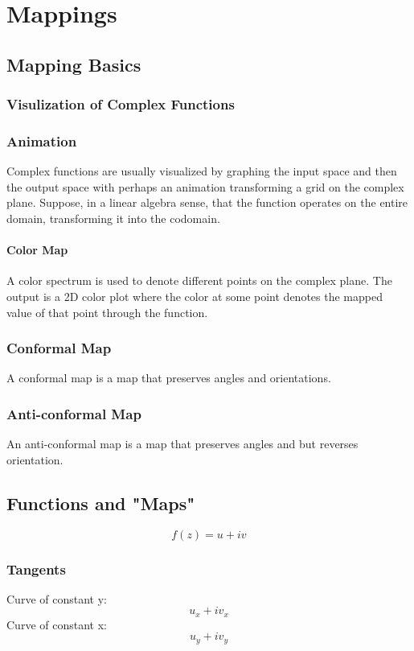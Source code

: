 \documentclass[../main.tex]{subfiles}
\begin{document}
\chapter{Mappings}
\section{Mapping Basics}
\subsection{Visulization of Complex Functions}
    \subsection{Animation}
        Complex functions are usually visualized by graphing the input space and then the output space
        with perhaps an animation transforming a grid on the complex plane. Suppose, in a linear algebra sense,
        that the function operates on the entire domain, transforming it into the codomain.

    \subsubsection{Color Map}
        A color spectrum is used to denote different points on the complex plane. The output is a 2D color plot
        where the color at some point denotes the mapped value of that point through the function.

\subsection{Conformal Map}
    A conformal map is a map that preserves angles and orientations.

\subsection{Anti-conformal Map}
    An anti-conformal map is a map that preserves angles and but reverses orientation.

\section{Functions and "Maps"}
$$f(z)=u+iv$$
\subsection{Tangents}
    Curve of constant y:
        $$u_{x}+iv_{x}$$
    Curve of constant x:
        $$u_{y}+iv_{y}$$
\end{document}
